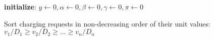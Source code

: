 		\begin{algorithm}%
			\footnotesize
			\caption{\ics}
			\label{alg:ics}
			\DontPrintSemicolon 
			
			\BlankLine
			
			\textbf{initialize}: $y\leftarrow 0, \alpha\leftarrow 0, \beta\leftarrow 0, \gamma\leftarrow 0, \pi\leftarrow 0$
			
			Sort charging requests in non-decreasing order of their unit values: $v_1/D_1 \geq v_2/D_2\geq\dots \geq v_n/D_n$
			
			
		\end{algorithm}
	
